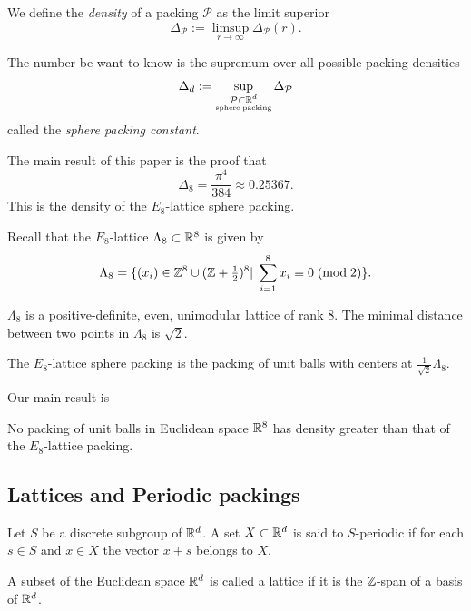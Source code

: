   \begin{definition} We define the \emph{density} of a packing $\mathcal{P}$ as the limit superior
  $$\Delta_{\mathcal{P}}:=\limsup\limits_{r\to\infty}\Delta_{\mathcal{P}}(r). $$
  \end{definition}

  \begin{definition}
  The number be want to know is the supremum over all possible packing densities
  $$\Delta_d:=\sup\limits_{\substack{\mathcal{P}\subset\mathbb{R}^d\\ \scriptscriptstyle\mathrm{sphere}\;\mathrm{packing}}}\Delta_{\mathcal{P}} $$
  called the \emph{sphere packing constant}.
  \end{definition}

  The main result of this paper is the proof that $$\Delta_8=\frac{\pi^4}{384}\approx 0.25367.$$
  This is the density of the $E_8$-lattice sphere packing.
  \begin{definition}Recall that the $E_8$-lattice $\Lambda_8\subset\mathbb{R}^8$ is given by
  $$\Lambda_8=\{(x_i)\in\mathbb{Z}^8\cup(\mathbb{Z}+\textstyle\frac12\displaystyle )^8|\;\sum_{i=1}^8x_i\equiv 0\;(\mathrm{mod\;2})\}.$$
  \end{definition}
  \begin{lemma}$\Lambda_8$ is a positive-definite, even, unimodular lattice of rank 8. The minimal distance between two points in $\Lambda_8$ is $\sqrt{2}$.
  \end{lemma}
  \begin{definition}
  The $E_8$-lattice sphere packing is the packing of unit balls with centers at $\frac{1}{\sqrt{2}}\Lambda_8.$
  \end{definition}
  Our main result is
  \begin{theorem}\label{thm: main}
  No packing of unit balls
  in Euclidean space $\mathbb{R}^8$ has density greater than that of the $E_8$-lattice packing.
  \end{theorem}

  \subsection{Lattices and Periodic packings}
  \begin{definition} Let $S$ be a discrete subgroup of $\mathbb{R}^d$. A set $X\subset\mathbb{R}^d$ is said to $S$-periodic if for each $s\in S$ and $x\in X$ the vector $x+s$ belongs to $X$.
  \end{definition}

  \begin{definition}\label{EuclideanLattice.is_lattice}\leanok
    A subset of the Euclidean space $\mathbb{R}^d$ is called a lattice if it is the $\mathbb{Z}$-span of a basis of $\mathbb{R}^d$.
  \end{definition}

